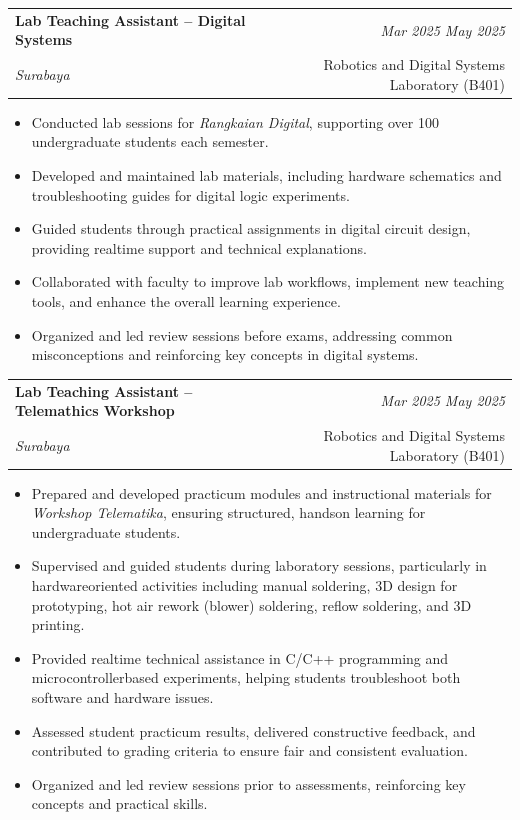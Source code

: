 \documentclass[a4paper,11pt]{article}
\makeatletter
\newcommand{\resumeSubheading}[4]{
\vspace{0.5mm}\item
    \begin{tabular*}{0.98\textwidth}[t]{l@{\extracolsep{\fill}}r}
        \textbf{#1} & \textit{\footnotesize{#4}} \\
        \textit{\footnotesize{#3}} &  \footnotesize{#2}\\
    \end{tabular*}
    \vspace{-2.4mm}
}
\newcommand{\resumeItemListStart}{\begin{justify}\begin{itemize}[leftmargin=3ex, rightmargin=2ex, noitemsep,labelsep=1.2mm,itemsep=0mm]\small}
\newcommand{\resumeItemListEnd}{\end{itemize}\end{justify}\vspace{-2mm}}
\makeatother
\begin{document}
\resumeSubheading
{Lab Teaching Assistant – Digital Systems}{Robotics and Digital Systems Laboratory (B401)}
{Surabaya}{Mar 2025 \- May 2025}
\resumeItemListStart
\item {Conducted lab sessions for \textit{Rangkaian Digital}, supporting over 100 undergraduate students each semester.}
\item {Developed and maintained lab materials, including hardware schematics and troubleshooting guides for digital logic experiments.}
\item {Guided students through practical assignments in digital circuit design, providing real\-time support and technical explanations.}
\item {Collaborated with faculty to improve lab workflows, implement new teaching tools, and enhance the overall learning experience.}
\item {Organized and led review sessions before exams, addressing common misconceptions and reinforcing key concepts in digital systems.}
\resumeItemListEnd
\vspace{-2mm}

\resumeSubheading
{Lab Teaching Assistant – Telemathics Workshop}{Robotics and Digital Systems Laboratory (B401)}
{Surabaya}{Mar 2025 \- May 2025}
\resumeItemListStart
\item {Prepared and developed practicum modules and instructional materials for \textit{Workshop Telematika}, ensuring structured, hands\-on learning for undergraduate students.}
\item {Supervised and guided students during laboratory sessions, particularly in hardware\-oriented activities including manual soldering, 3D design for prototyping, hot air rework (blower) soldering,  reflow soldering, and 3D printing.}
\item {Provided real\-time technical assistance in C/C++ programming and microcontroller\-based experiments, helping students troubleshoot both software and hardware issues.}
\item {Assessed student practicum results, delivered constructive feedback, and contributed to grading criteria to ensure fair and consistent evaluation.}
\item {Organized and led review sessions prior to assessments, reinforcing key concepts and practical skills.}
\resumeItemListEnd
\end{document}
